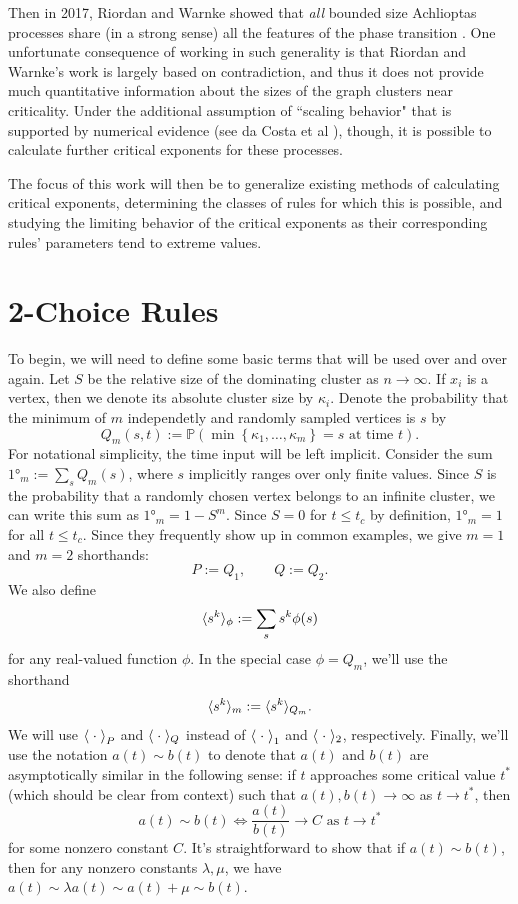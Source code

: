 \documentclass[twoside,10pt]{article}
\begin{document}
Then in 2017, Riordan and Warnke showed that \emph{all} bounded size Achlioptas processes share (in a strong sense) all the features of the \ER phase transition \cite{RW-bounded}. One unfortunate consequence of working in such generality is that Riordan and Warnke's work is largely based on contradiction, and thus it does not provide much quantitative information about the sizes of the graph clusters near criticality. Under the additional assumption of ``scaling behavior" that is supported by numerical evidence (see da Costa et al \cite{daCosta}), though, it is possible to calculate further critical exponents for these processes.

The focus of this work will then be to generalize existing methods of calculating critical exponents, determining the classes of rules for which this is possible, and studying the limiting behavior of the critical exponents as their corresponding rules' parameters tend to extreme values.

\section{2-Choice Rules}

To begin, we will need to define some basic terms that will be used over and over again. Let $S$ be the relative size of the dominating cluster as $n \to \infty$. If $x_i$ is a vertex, then we denote its absolute cluster size by $\kappa_i$. Denote the probability that the minimum of $m$ independetly and randomly sampled vertices is $s$ by
\[
        Q_m(s, t) := \mathbb{P}\left( \min\left\{ \kappa_1, \dots, \kappa_m \right\} = s \text{ at time } t \right) .
\]
For notational simplicity, the time input will be left implicit. Consider the sum $\ang{1}_{m} := \sum_{s} Q_{m}(s)$, where $s$ implicitly ranges over only finite values. Since $S$ is the probability that a randomly chosen vertex belongs to an infinite cluster, we can write this sum as $\ang{1}_{m} = 1-S^{m}$. Since $S=0$ for $t \leq t_{c}$ by definition, $\ang{1}_{m}=1$ for all $t \leq t_c$. Since they frequently show up in common examples, we give $m=1$ and $m=2$ shorthands:
\[
        P := Q_1, \quad\quad Q := Q_2.
\]
We also define
\[
	\langle s^{k} \rangle_{\phi} := \sum_{s} s^{k} \phi(s)
\] 
for any real-valued function $\phi$. In the special case $\phi = Q_{m}$, we'll use the shorthand
\[
        \langle s^{k} \rangle_{m} := \langle s^{k} \rangle_{Q_{m}}.
\]
We will use $\left\langle \;\cdot\; \right\rangle_{P}$ and $\langle \;\cdot\; \rangle_{Q}$ instead of $\left\langle \;\cdot\; \right\rangle_{1}$ and $\langle \;\cdot\; \rangle_{2}$, respectively. Finally, we'll use the notation $a(t) \sim b(t)$ to denote that $a(t)$ and $b(t)$ are asymptotically similar in the following sense: if $t$ approaches some critical value $t^{*}$ (which should be clear from context) such that $a(t), b(t) \to \infty$ as $t\to t^{*}$, then
\[
a(t) \sim b(t) \iff \frac{a(t)}{b(t)} \to C \text{ as } t\to t^{*}
\] for some nonzero constant $C$. It's straightforward to show that if $a(t) \sim b(t)$, then for any nonzero constants $\lambda, \mu$, we have $a(t) \sim \lambda a(t) \sim a(t) + \mu \sim b(t)$.
\end{document}
